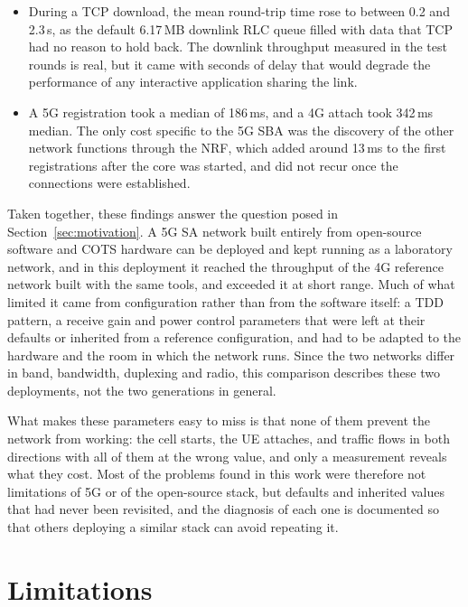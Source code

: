 \begin{itemize}
    \item During a TCP download, the mean round-trip time rose to between 0.2 and 2.3\,s, as the default 6.17\,MB downlink \gls{RLC} queue filled with data that TCP had no reason to hold back. The downlink throughput measured in the test rounds is real, but it came with seconds of delay that would degrade the performance of any interactive application sharing the link.

    \item A 5G registration took a median of 186\,ms, and a 4G attach took 342\,ms median. The only cost specific to the 5G \gls{SBA} was the discovery of the other network functions through the \gls{NRF}, which added around 13\,ms to the first registrations after the core was started, and did not recur once the connections were established.
\end{itemize}

Taken together, these findings answer the question posed in Section~\ref{sec:motivation}. A 5G \gls{SA} network built entirely from open-source software and \gls{COTS} hardware can be deployed and kept running as a laboratory network, and in this deployment it reached the throughput of the 4G reference network built with the same tools, and exceeded it at short range. Much of what limited it came from configuration rather than from the software itself: a \gls{TDD} pattern, a receive gain and power control parameters that were left at their defaults or inherited from a reference configuration, and had to be adapted to the hardware and the room in which the network runs. Since the two networks differ in band, bandwidth, duplexing and radio, this comparison describes these two deployments, not the two generations in general.

What makes these parameters easy to miss is that none of them prevent the network from working: the cell starts, the \gls{UE} attaches, and traffic flows in both directions with all of them at the wrong value, and only a measurement reveals what they cost. Most of the problems found in this work were therefore not limitations of 5G or of the open-source stack, but defaults and inherited values that had never been revisited, and the diagnosis of each one is documented so that others deploying a similar stack can avoid repeating it.

\section{Limitations}
\label{sec:conclusions-limitations}

